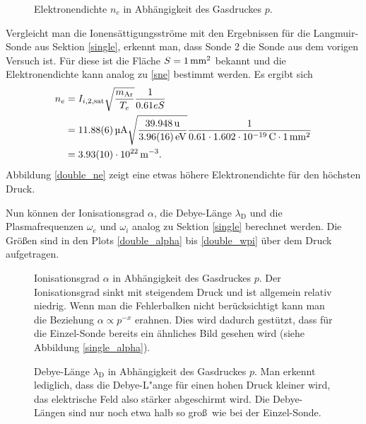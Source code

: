 \begin{figure}[htbp]
    \centering
    
    \caption{
        Elektronendichte $n_e$ in Abh\"angigkeit des Gasdruckes $p$.
    }
    \label{double_ne}
\end{figure}

Vergleicht man die Ionens\"attigungsstr\"ome mit den Ergebnissen f\"ur die Langmuir-Sonde aus Sektion \ref{single}, erkennt man, dass Sonde 2 die Sonde aus dem vorigen Versuch ist.
F\"ur diese ist die Fl\"ache $S=\SI{1}{\milli\metre\squared}$ bekannt und die Elektronendichte kann analog zu \eqref{sne} bestimmt werden.
Es ergibt sich
\begin{align}
n_e
    &=I_{i,2,\text{sat}}\sqrt{\frac{m_\text{Ar}}{T_e}}\frac{1}{0.61eS}\label{sne}\\
    &=\siBIibsata\sqrt{\frac{\simAr}{\siBTea}}\frac{1}{0.61\cdot \sie \cdot\siS}\nonumber\\
    &=\siBnea .\nonumber
\end{align}
Abbildung \vref{double_ne} zeigt eine etwas h\"ohere Elektronendichte f\"ur den h\"ochsten Druck.

Nun k\"onnen der Ionisationsgrad $\alpha$, die Debye-L\"ange $\lambda_\text{D}$ und die Plasmafrequenzen $\omega_e$ und $\omega_i$ analog zu Sektion \ref{single} berechnet werden.
Die Gr\"o\ss en sind in den Plots \vref{double_alpha} bis \vref{double_wpi} \"uber dem Druck aufgetragen.

\begin{figure}[htbp]
    \centering
    
    \caption{
        Ionisationsgrad $\alpha$ in Abh\"angigkeit des Gasdruckes $p$.
        Der Ionisationsgrad sinkt mit steigendem Druck und ist allgemein relativ niedrig.
        Wenn man die Fehlerbalken nicht ber\"ucksichtigt kann man die Beziehung $\alpha\propto p^{-x}$ erahnen.
        Dies wird dadurch gest\"utzt, dass f\"ur die Einzel-Sonde bereits ein \"ahnliches Bild gesehen wird (siehe Abbildung \vref{single_alpha}).
    }
    \label{double_alpha}
\end{figure}

\begin{figure}[htbp]
    \centering
    
    \caption{
        Debye-L\"ange $\lambda_\text{D}$ in Abh\"angigkeit des Gasdruckes $p$.
        Man erkennt lediglich, dass die Debye-L"ange f\"ur einen hohen Druck kleiner wird, das elektrische Feld also st\"arker abgeschirmt wird.
        Die Debye-L\"angen sind nur noch etwa halb so gro\ss\ wie bei der Einzel-Sonde.
    }
    \label{double_deb}
\end{figure}

